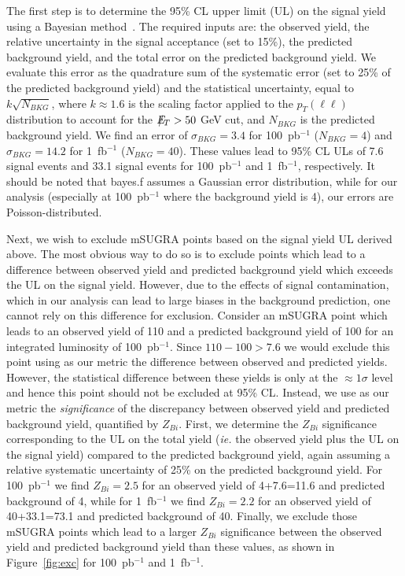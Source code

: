 The first  step is to  determine the 95\%  CL upper limit (UL)  on the
signal yield using a Bayesian method~\cite{bayes}. The required  inputs 
are: the observed yield, the
relative  uncertainty in  the  signal acceptance  (set  to 15\%),  the
predicted  background yield,  and  the total  error  on the  predicted
background yield. We evaluate this  error as the quadrature sum of the
systematic error (set  to 25\% of the predicted  background yield) and
the  statistical   uncertainty,  equal  to   $k\sqrt{N_{BKG}}$,  where
$k\approx1.6$ is  the scaling factor applied  to the $p_{T}(\ell\ell)$
distribution to  account for the  $E\!\!\!\!/_T>50~$GeV cut, and  $N_{BKG}$ is
the   predicted    background   yield.    We   find    an   error   of
$\sigma_{BKG}=3.4$     for     100~pb$^{-1}$     ($N_{BKG}=4$)     and
$\sigma_{BKG}=14.2$ for 1~fb$^{-1}$  ($N_{BKG}=40$). These values lead
to  95\% CL  ULs  of 7.6  signal  events and  33.1  signal events  for
100~pb$^{-1}$ and  1~fb$^{-1}$, respectively. It should  be noted that
bayes.f assumes a Gaussian  error distribution, while for our analysis
(especially  at 100~pb$^{-1}$ where  the background  yield is  4), our
errors are Poisson-distributed.

Next, we  wish to exclude mSUGRA  points based on the  signal yield UL
derived above.   The most obvious  way to do  so is to  exclude points
which  lead  to a  difference  between  observed  yield and  predicted
background yield  which exceeds the  UL on the signal  yield. However,
due to the effects of  signal contamination, which in our analysis can
lead to large biases in  the background prediction, one cannot rely on
this difference for exclusion. Consider an mSUGRA point which leads to
an observed yield  of 110 and a predicted background  yield of 100 for
an  integrated luminosity  of 100~pb$^{-1}$.   Since  $110-100>7.6$ we
would exclude  this point using  as our metric the  difference between
observed  and predicted  yields. However,  the  statistical difference
between these yields  is only at the $\approx1\sigma$  level and hence
this point should  not be excluded at 95\% CL. Instead,  we use as our
metric  the {\em  significance}  of the  discrepancy between  observed
yield and predicted background  yield, quantified by $Z_{Bi}$.  First,
we determine the $Z_{Bi}$ significance  corresponding to the UL on the
total yield ({\em  ie.}  the observed yield plus the  UL on the signal
yield) compared  to the predicted  background yield, again  assuming a
relative systematic  uncertainty of  25\% on the  predicted background
yield.  For  100~pb$^{-1}$ we find $Z_{Bi}=2.5$ for  an observed yield
of 4+7.6=11.6 and predicted background  of 4, while for 1~fb$^{-1}$ we
find $Z_{Bi}=2.2$ for an  observed yield of 40+33.1=73.1 and predicted
background of 40.  Finally, we  exclude those mSUGRA points which lead
to  a larger  $Z_{Bi}$  significance between  the  observed yield  and
predicted   background  yield   than   these  values,   as  shown   in
Figure~\ref{fig:exc}   for 100~pb$^{-1}$  and
1~fb$^{-1}$.



